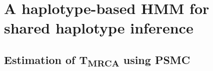 






%
%
%
%


%
\section{A haplotype-based HMM for shared haplotype inference}
%

%

%



%
\subsection{Estimation of T\textsubscript{MRCA} using PSMC}
%


